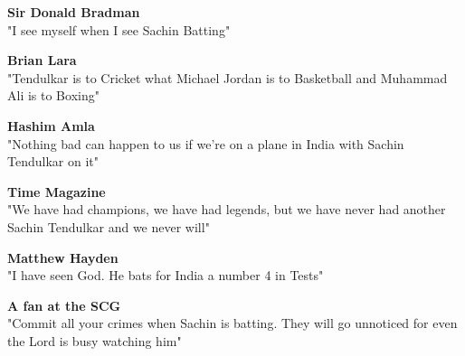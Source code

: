 \documentclass{article}
\begin{document}
\begin{center}

\textbf{\Large Sir Donald Bradman\\}
"I see myself when I see Sachin Batting"
\vspace{80pt}

\textbf{\Large Brian Lara}\\
"Tendulkar is to Cricket what Michael Jordan is to Basketball and Muhammad Ali is to Boxing"
\vspace{80pt}

\textbf{\Large Hashim Amla}\\
"Nothing bad can happen to us if we're on a plane in India with Sachin Tendulkar on it"
\vspace{80pt}

\textbf{\Large Time Magazine}\\
"We have had champions, we have had legends, but we have never had another Sachin Tendulkar and we never will"
\vspace{80pt}

\textbf{\Large Matthew Hayden}\\
"I have seen God. He bats for India a number 4 in Tests"
\vspace{80pt}

\textbf{\Large A fan at the SCG}\\
"Commit all your crimes when Sachin is batting. They will go unnoticed for even the Lord is busy watching him"

\vspace{80pt}
\cite{scoop}
\end{center}


\restoregeometry
\newpage
\tableofcontents
{}
\listoffigures
\listoftables
\end{document}
